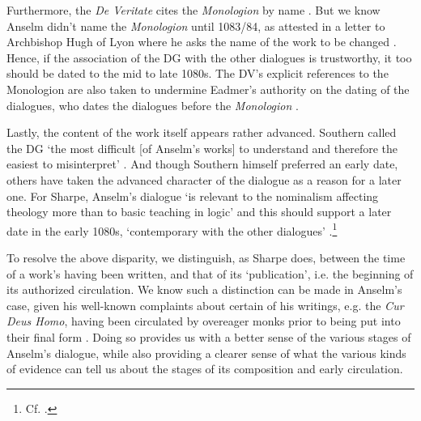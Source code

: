\documentclass[]{article}
\begin{document}
Furthermore, the \textit{De Veritate} cites the \textit{Monologion} by name \cite[DV ch. 1; ch. 10]{AnselmDV}. But we know Anselm didn't name the \textit{Monologion} until 1083/84, as attested in a letter to Archbishop Hugh of Lyon where he asks the name of the work to be changed \cite[Ep. 109]{Anselm1990}. Hence, if the association of the DG with the other dialogues is trustworthy, it too should be dated to the mid to late 1080s. The DV's explicit references to the Monologion are also taken to undermine Eadmer's authority on the dating of the dialogues, who dates the dialogues before the \textit{Monologion} \cite[VA I, 25-26]{VA}.

Lastly, the content of the work itself appears rather advanced. Southern called the DG `the most difficult [of Anselm's works] to understand and therefore the easiest to misinterpret' \cite[p. 15]{Southern1963}. And though Southern himself preferred an early date, others have taken the advanced character of the dialogue as a reason for a later one. For Sharpe, Anselm's dialogue `is relevant to the nominalism affecting theology more than to basic teaching in logic' and this should support a later date in the early 1080s, `contemporary with the other dialogues' \cite[p. 22]{Sharpe2009}.\footnote{Cf. \cite{Mews1992}.}

To resolve the above disparity, we distinguish, as Sharpe does, between the time of a work's having been written, and that of its `publication', i.e. the beginning of its authorized circulation. We know such a distinction can be made in Anselm's case, given his well-known complaints about certain of his writings, e.g. the \textit{Cur Deus Homo}, having been circulated by overeager monks prior to being put into their final form \cite[p. 5]{Sharpe2009}. Doing so provides us with a better sense of the various stages of Anselm's dialogue, while also providing a clearer sense of what the various kinds of evidence can tell us about the stages of its composition and early circulation.
\end{document}

